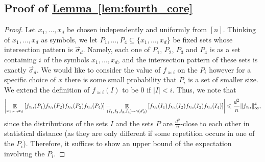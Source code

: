 \documentclass[11pt]{article}
\newcommand{\expref}[2]{\texorpdfstring{\hyperref[#2]{#1~\ref{#2}}}{#1~\ref{#2}}}
\newcommand\card[1]{\left| {#1} \right|}
\newcommand\Expect[2]{{\mathop{\mathbb{E}}_{#1}\left[ {#2} \right]}}
\newcommand\norm[1]{\| #1 \|}
\renewcommand\leq{\leqslant}
\newcommand\approxlvlfn[2]{{#1}_{\approx{#2}}}
\begin{document}
\subsection{Proof of \expref{Lemma}{lem:fourth_core}}    %
\begin{proof}
Let $x_1,...,x_d$ be chosen independently and uniformly from $[n]$.
Thinking of $x_1,\ldots,x_d$ as symbols, we let $P_1,...,P_4\subseteq \{x_1,\ldots,x_d\}$ be
fixed %
sets %
%
%
whose intersection pattern is $\vec{\sigma}_d$.
Namely, each one of $P_1$, $P_2$, $P_3$ and $P_4$ is
%
%
as a set containing $i$ of the symbols %
%
$x_1,\ldots,x_d$, and the intersection pattern of these sets is
exactly $\vec{\sigma}_d$.
We would like to consider the value of $\approxlvlfn{f}{i}$
on the %
$P_i$   %
however for a specific choice of $x$ there is some small probability that $P_i$ is a set of smaller
size. We extend the definition of $\approxlvlfn{f}{i}(I)$ to be $0$ if $\card{I} < i$.
Thus, we note that
\[
\card{
\Expect{x_1,...,x_d}{
\approxlvlfn{f}{i}(P_1)\approxlvlfn{f}{i}(P_2)\approxlvlfn{f}{i}(P_3)\approxlvlfn{f}{i}(P_4)}
-\hspace{-2ex}
\Expect{(I_1,I_2,I_3,I_4) \sim \gamma(\vec{\sigma_d})}{
\approxlvlfn{f}{i}(I_1)\approxlvlfn{f}{i}(I_2)\approxlvlfn{f}{i}(I_3)\approxlvlfn{f}{i}(I_4)
}}
\leq \frac{d^2}{n}\norm{\approxlvlfn{f}{i}}^4_{\infty},
\]
since the distributions of the %
sets $I$ and the sets $P$   %
are $\frac{d^2}{n}$-close  %
to each other in statistical distance
(as they are only different if some repetition occurs in
one of the %
$P_i$).   %
Therefore, it suffices to show an upper bound of the expectation involving
the %
$P_i$.   %


\end{proof}
\end{document}
